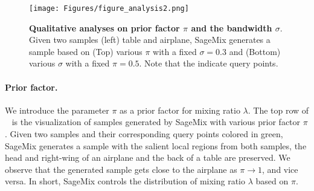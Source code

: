 \documentclass{article}
\begin{document}
\begin{figure}[t]
\centering
\texttt{[image: Figures/figure\_analysis2.png]}
\caption{\textbf{Qualitative analyses on prior factor $\pi$ and the bandwidth $\sigma$}. 
Given two samples (left) table and airplane, SageMix generates a sample based on (Top) various $\pi$ with a fixed $\sigma=0.3$ and (Bottom) various $\sigma$ with a fixed $\pi=0.5$. 
Note that the  indicate query points.
}
\label{fig:figure_analysis} 
\end{figure} \paragraph{Prior factor.} We introduce the parameter $\pi$ as a prior factor for mixing ratio $\lambda$. 
The top row of ~ is the visualization of samples generated by SageMix with various prior factor $\pi$. 
Given two samples and their corresponding query points colored in green, SageMix generates a sample with the salient local regions from both samples, \eg the head and right-wing of an airplane and the back of a table are preserved. 
We observe that the generated sample gets close to the airplane as $\pi \rightarrow 1$, and vice versa. In short, SageMix controls the distribution of mixing ratio $\lambda$ based on $\pi$.
\end{document}
